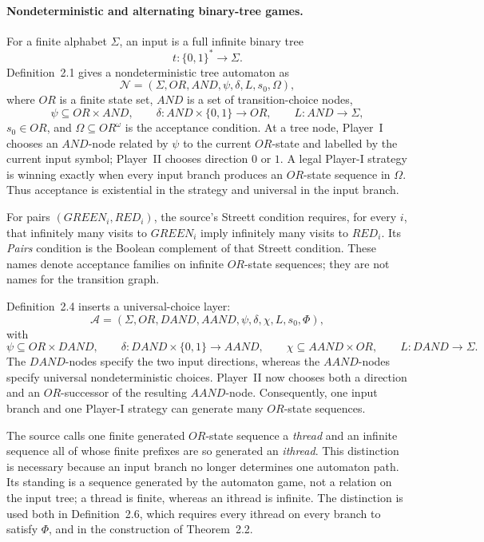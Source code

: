 \paragraph{Nondeterministic and alternating binary-tree games.}
For a finite alphabet \(\Sigma\), an input is a full infinite binary tree
\[
 t:\{0,1\}^*\longrightarrow\Sigma.
\]
Definition~2.1 gives a nondeterministic tree automaton as
\[
 \mathcal N=(\Sigma,OR,AND,\psi,\delta,L,s_0,\Omega),
\]
where \(OR\) is a finite state set, \(AND\) is a set of transition-choice
nodes,
\[
 \psi\subseteq OR\times AND,\qquad
 \delta:AND\times\{0,1\}\longrightarrow OR,\qquad
 L:AND\longrightarrow\Sigma,
\]
\(s_0\in OR\), and \(\Omega\subseteq OR^\omega\) is the acceptance condition.
At a tree node, Player~I chooses an \(AND\)-node related by \(\psi\) to the
current \(OR\)-state and labelled by the current input symbol; Player~II chooses
direction \(0\) or \(1\).  A legal Player-I strategy is winning exactly when
every input branch produces an \(OR\)-state sequence in \(\Omega\).  Thus
acceptance is existential in the strategy and universal in the input branch.

For pairs \((GREEN_i,RED_i)\), the source's Streett condition requires, for
every \(i\), that infinitely many visits to \(GREEN_i\) imply infinitely many
visits to \(RED_i\).  Its \emph{Pairs} condition is the Boolean complement of
that Streett condition.  These names denote acceptance families on infinite
\(OR\)-state sequences; they are not names for the transition graph.

Definition~2.4 inserts a universal-choice layer:
\[
 \mathcal A=
 (\Sigma,OR,DAND,AAND,\psi,\delta,\chi,L,s_0,\Phi),
\]
with
\[
 \psi\subseteq OR\times DAND,\qquad
 \delta:DAND\times\{0,1\}\longrightarrow AAND,\qquad
 \chi\subseteq AAND\times OR,\qquad
 L:DAND\longrightarrow\Sigma.
\]
The \(DAND\)-nodes specify the two input directions, whereas the
\(AAND\)-nodes specify universal nondeterministic choices.  Player~II now
chooses both a direction and an \(OR\)-successor of the resulting
\(AAND\)-node.  Consequently, one input branch and one Player-I strategy can
generate many \(OR\)-state sequences.

The source calls one finite generated \(OR\)-state sequence a \emph{thread} and
an infinite sequence all of whose finite prefixes are so generated an
\emph{ithread}.  This distinction is necessary because an input branch no
longer determines one automaton path.  Its standing is a sequence generated by
the automaton game, not a relation on the input tree; a thread is finite,
whereas an ithread is infinite.  The distinction is used both in
Definition~2.6, which requires every ithread on every branch to satisfy
\(\Phi\), and in the construction of Theorem~2.2.


